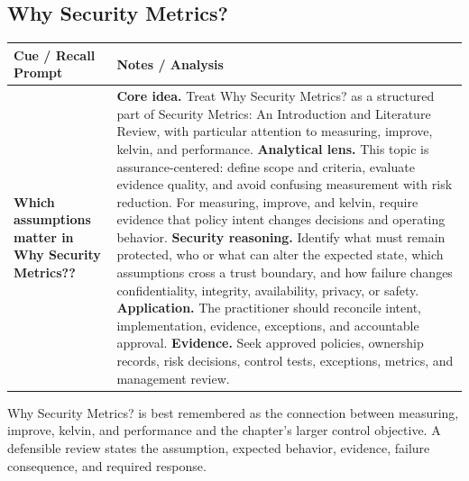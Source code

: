 \documentclass[11pt]{article}
\newcommand{\CornellHeader}{%
\rowcolor{Navy}\color{white}\bfseries Cue / Recall Prompt & \color{white}\bfseries Notes / Analysis\\\hline}
\newcommand{\CornellRow}[2]{%
\cellcolor{CueGray}\RaggedRight\textbf{#1} & \RaggedRight #2\\\hline}
\begin{document}
\subsection*{Why Security Metrics?}
\begin{longtable}{>{\RaggedRight\arraybackslash}p{}|>{\RaggedRight\arraybackslash}p{}}
\CornellHeader
\CornellRow{Which assumptions matter in Why Security Metrics??}{\textbf{Core idea.} Treat Why Security Metrics? as a structured part of Security Metrics: An Introduction and Literature Review, with particular attention to measuring, improve, kelvin, and performance. \textbf{Analytical lens.} This topic is assurance-centered: define scope and criteria, evaluate evidence quality, and avoid confusing measurement with risk reduction. For measuring, improve, and kelvin, require evidence that policy intent changes decisions and operating behavior. \textbf{Security reasoning.} Identify what must remain protected, who or what can alter the expected state, which assumptions cross a trust boundary, and how failure changes confidentiality, integrity, availability, privacy, or safety. \textbf{Application.} The practitioner should reconcile intent, implementation, evidence, exceptions, and accountable approval. \textbf{Evidence.} Seek approved policies, ownership records, risk decisions, control tests, exceptions, metrics, and management review.}
\end{longtable}
\begin{topicsummary}
Why Security Metrics? is best remembered as the connection between measuring, improve, kelvin, and performance and the chapter's larger control objective. A defensible review states the assumption, expected behavior, evidence, failure consequence, and required response.
\end{topicsummary}
\end{document}
